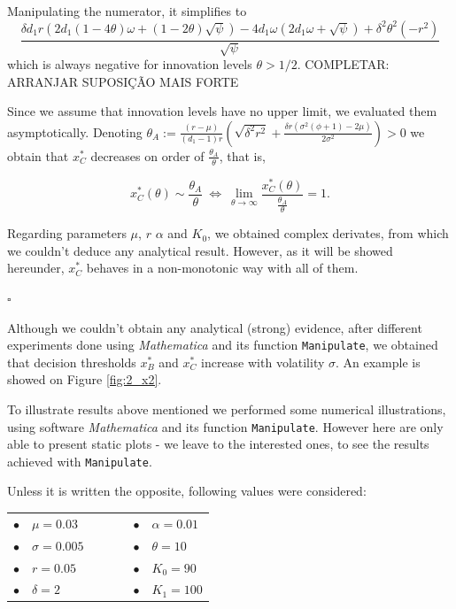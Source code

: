 Manipulating the numerator, it simplifies to
$$
\frac{\delta  d_1 r \left(2 d_1 (1-4 \theta ) \omega +(1-2 \theta ) \sqrt{\psi }\right)-4 d_1 \omega  \left(2 d_1 \omega +\sqrt{\psi }\right)+\delta ^2 \theta ^2 \left(-r^2\right)}{\sqrt{\psi}}$$
which is always negative for innovation levels $\theta>1/2$. COMPLETAR: ARRANJAR SUPOSIÇÃO MAIS FORTE

Since we assume that innovation levels have no upper limit, we evaluated them asymptotically. Denoting $\theta_A:=\frac{(r-\mu )}{(d_1-1) r}  \left(\sqrt{\delta ^2 r^2}+\frac{\delta  r \left(\sigma ^2 (\phi +1)-2 \mu \right)}{2 \sigma ^2}\right)>0$ we obtain that $x^*_C$ decreases on order of $\frac{\theta_A}{\theta}$, that is,  

$$x^*_C(\theta) \sim \frac{\theta_A}{\theta} \ \Leftrightarrow \ \lim_{\theta \to \infty} \frac{x^*_C(\theta)}{\frac{\theta_A}{\theta}}=1.$$

Regarding parameters $\mu$, $r$ $\alpha$ and $K_0$, we obtained complex derivates, from which we couldn't deduce any analytical result. However, as it will be showed hereunder, $x^*_C$ behaves in a non-monotonic way with all of them.
\begin{flushright}
	$\square$
\end{flushright}


Although we couldn't obtain any analytical (strong) evidence, after different experiments done using \textit{Mathematica} and its function \texttt{Manipulate}, we obtained that decision thresholds $x^*_B$ and $x^*_C$ increase with volatility $\sigma$. An example is showed on Figure \ref{fig:2_x2}.



To illustrate results above mentioned we performed some numerical illustrations, using software \textit{Mathematica} and its function \texttt{Manipulate}. However here are only able to present static plots - we leave to the interested ones, to see the results achieved with \texttt{Manipulate}.

Unless it is written the opposite, following values were considered:
\begin{table}[!htb]
	\centering
	\begin{tabular}{lllllll}
		$\bullet$ & $\mu=0.03$     &  & \hspace{7cm} &  &  $\bullet$ & $\alpha=0.01$ \\
		$\bullet$ & $\sigma=0.005$ &  & \hspace{7cm} &  &  $\bullet$ & $\theta=10$   \\
		$\bullet$ & $r=0.05$       &  & \hspace{7cm} &  &  $\bullet$ & $K_0=90$       \\
		$\bullet$ & $\delta=2$     &  & \hspace{7cm} & &  $\bullet$ & $K_1=100$                                   
	\end{tabular}
\end{table}

